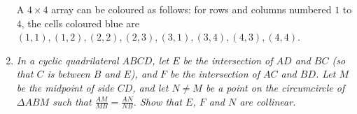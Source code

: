 \documentclass[a4paper,12pt]{article}
\begin{document}
\begin{enumerate}
	A $4\times 4$ array can be coloured as follows: for rows and columns numbered $1$ to $4$, the cells coloured blue are $(1,1),(1,2),(2,2),(2,3),(3,1),(3,4),(4,3),(4,4)$.
	
	\item %
	\textit{In a cyclic quadrilateral $ABCD$, let $E$ be the intersection of $AD$ and $BC$ (so that $C$ is between $B$ and $E$), and $F$ be the intersection of $AC$ and $BD$. Let $M$ be the midpoint of side $CD$, and let $N\neq M$ be a point on the circumcircle of $\Delta ABM$ such that $\frac{AM}{MB}=\frac{AN}{NB}$. Show that $E$, $F$ and $N$ are collinear.}
	

\end{enumerate}
\end{document}

